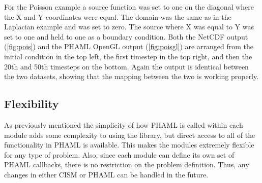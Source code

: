 
  

For the Poisson example a source function was set to one on the diagonal where the X and Y coordinates were equal.  The domain was the same as in the Laplacian example and was set to zero.  The source where X was equal to Y was set to one and held to one as a boundary condition.  Both the NetCDF output (\ref{fig:pois}) and the PHAML OpenGL output (\ref{fig:poisgl}) are arranged from the initial condition in the top left, the first timestep in the top right, and then the 20th and 50th timesteps on the bottom.  Again the output is identical between the two datasets, showing that the mapping between the two is working properly.


  

\subsection{Flexibility}

As previously mentioned the simplicity of how PHAML is called within each module adds some complexity to using the library, but direct access to all of the functionality in PHAML is available.  This makes the modules extremely flexible for any type of problem.  Also, since each module can define its own set of PHAML callbacks, there is no restriction on the problem definition.  Thus, any changes in either CISM or PHAML can be handled in the future.
